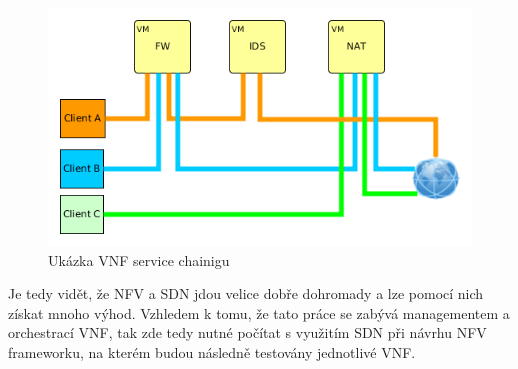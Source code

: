 \begin{figure}[h]
\begin{centering}
\includegraphics[scale=0.6]{images/service_chaining_new}
\par\end{centering}
\caption{Ukázka VNF service chainigu\label{fig:service_chaining_new}}
\end{figure}

Je tedy vidět, že NFV a SDN jdou velice dobře dohromady a lze pomocí nich získat mnoho výhod. Vzhledem k tomu, že tato práce se zabývá managementem a orchestrací VNF, tak zde tedy nutné počítat s využitím SDN při návrhu NFV frameworku, na kterém budou následně testovány jednotlivé VNF.